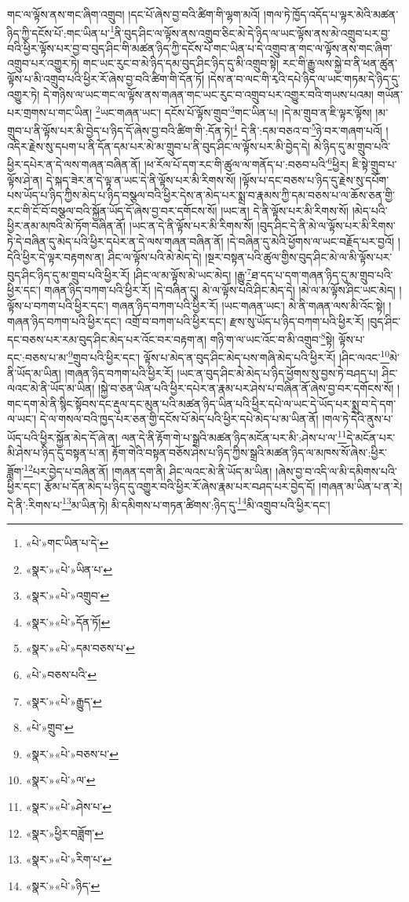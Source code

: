 གང་ལ་ལྟོས་ནས་གང་ཞིག་འགྲུབ། །དང་པོ་ཞེས་བྱ་བའི་ཚིག་གི་ལྷག་མའོ། །གལ་ཏེ་ཁྱོད་འདོད་པ་ལྟར་མེའི་མཚན་ཉིད་ཀྱི་དངོས་པོ་:གང་ཡིན་པ་\footnote{«པེ་»གང་ཡིན་པ་དེ་}ནི་བུད་ཤིང་ལ་ལྟོས་ནས་འགྲུབ་ཅིང་མེ་དེ་ཉིད་ལ་ཡང་ལྟོས་ནས་མེ་འགྲུབ་པར་བྱ་བའི་ཕྱིར་ལྟོས་པར་བྱ་བ་བུད་ཤིང་གི་མཚན་ཉིད་ཀྱི་དངོས་པོ་གང་ཡིན་པ་དེ་འགྲུབ་ན་གང་ལ་ལྟོས་ནས་གང་ཞིག་འགྲུབ་པར་འགྱུར་ཏེ། གང་ཡང་རུང་བ་མེ་ཉིད་དམ་བུད་ཤིང་ཉིད་དུ་མི་འགྲུབ་སྟེ། རང་གི་རྒྱུ་ལས་སྐྱེ་བ་ནི་ཕན་ཚུན་ལྟོས་པ་མི་འགྲུབ་པའི་ཕྱིར་རོ་ཞེས་བྱ་བའི་ཚིག་གི་དོན་ཏོ། །དེས་ན་བ་ལང་གི་རྭའི་དཔེ་ཉིད་ལ་ཡང་གཏམ་དེ་ཉིད་དུ་འགྱུར་ཏེ། དེ་གཉིས་ལ་ཡང་གང་ལ་ལྟོས་ནས་གཞན་གང་ཡང་རུང་བ་འགྲུབ་པར་འགྱུར་བའི་གཡས་པའམ། གཡོན་པར་གྲགས་པ་གང་ཡིན། \footnote{«སྣར་»«པེ་»ཡིན་པ་}ཡང་གཞན་ཡང་། དངོས་པོ་ལྟོས་གྲུབ་\footnote{«སྣར་»«པེ་»འགྲུབ་}གང་ཡིན་པ། །དེ་མ་གྲུབ་ན་ཇི་ལྟར་ལྟོས། །མ་གྲུབ་པ་ནི་ལྟོས་པར་མི་བྱེད་པ་ཉིད་དོ་ཞེས་བྱ་བའི་ཚིག་གི་:དོན་ཏེ།\footnote{«སྣར་»«པེ་»དོན་ཏོ།} དེ་ནི་:དམ་བཅའ་བ་\footnote{«སྣར་»«པེ་»དམ་བཅས་པ་}ཉེ་བར་གཞག་པའོ། །འདིར་རྗེས་སུ་དཔག་པ་ནི་དོན་དམ་པར་མེ་མ་གྲུབ་པ་ནི་བུད་ཤིང་ལ་ལྟོས་པར་མི་བྱེད་དེ། མེ་ཉིད་དུ་མ་གྲུབ་པའི་ཕྱིར་དཔེར་ན་དེ་ལས་གཞན་བཞིན་ནོ། །ཕ་རོལ་པོ་དག་རང་གི་ཚུལ་ལ་གནོད་པ་:བཅབ་པའི་\footnote{«པེ་»བཅས་པའི་}ཕྱིར། ཇི་སྟེ་གྲུབ་པ་ལྟོས་ཤེ་ན། དེ་སྐད་ཟེར་ན་དེ་ལྟ་ན་ཡང་དེ་ནི་ལྟོས་པར་མི་རིགས་སོ། །ལྟོས་པ་དང་བཅས་པ་ཉིད་དུ་རྗེས་སུ་དཔོག་པས་ཡོད་པ་ཉིད་ཀྱིས་མེད་པ་ཉིད་བསྩལ་བའི་ཕྱིར་དེས་ན་མེད་པར་སྨྲ་བ་རྣམས་ཀྱི་དམ་བཅས་པ་ལ་ཆོས་ཅན་གྱི་རང་གི་ངོ་བོ་བསྩལ་བའི་སྐྱོན་ཡོད་དོ་ཞེས་བྱ་བར་དགོངས་སོ། །ཡང་ན། དེ་ནི་ལྟོས་པར་མི་རིགས་སོ། །མེད་པའི་ཕྱིར་ནམ་མཁའི་མེ་ཏོག་བཞིན་ནོ། །ཡང་ན་དེ་ནི་ལྟོས་པར་མི་རིགས་སོ། །བུད་ཤིང་དེ་ནི་མེ་ལ་ལྟོས་པར་མི་རིགས་ཏེ་དེ་བཞིན་དུ་མེད་པའི་ཕྱིར་དཔེར་ན་དེ་ལས་གཞན་བཞིན་ནོ། །དེ་བཞིན་དུ་མེའི་ཕྱོགས་ལ་ཡང་བརྗོད་པར་བྱའོ། །དེའི་ཕྱིར་དེ་ལྟར་བརྟགས་ན། ཤིང་ལ་ལྟོས་པའི་མེ་མེད་དེ། །སྔར་བསྟན་པའི་ཚུལ་གྱིས་བུད་ཤིང་མེ་ལ་མི་ལྟོས་པར་བུད་ཤིང་ཉིད་དུ་མ་གྲུབ་པའི་ཕྱིར་རོ། །ཤིང་ལ་མ་ལྟོས་མེ་ཡང་མེད། །རྒྱུ་\footnote{«སྣར་»«པེ་»རྒྱུད་}ཐ་དད་པ་དག་གཞན་ཉིད་དུ་མ་གྲུབ་པའི་ཕྱིར་དང་། གཞན་ཉིད་བཀག་པའི་ཕྱིར་རོ། །དེ་བཞིན་དུ། མེ་ལ་ལྟོས་པའི་ཤིང་མེད་དེ། །མེ་ལ་མ་ལྟོས་ཤིང་ཡང་མེད། །ལྟོས་པ་བཀག་པའི་ཕྱིར་དང་། གཞན་ཉིད་བཀག་པའི་ཕྱིར་རོ། །ཡང་གཞན་ཡང་། མེ་ནི་གཞན་ལས་མི་འོང་སྟེ། །གཞན་ཉིད་བཀག་པའི་ཕྱིར་དང་། འགྲོ་བ་བཀག་པའི་ཕྱིར་དང་། རྫས་སུ་ཡོད་པ་ཉིད་བཀག་པའི་ཕྱིར་རོ། །བུད་ཤིང་དང་བཅས་པར་རམ་བུད་ཤིང་མེད་པར་འོང་བར་བརྟག་ན། གཉི་ག་ལ་ཡང་འོང་བ་མི་འགྲུབ་\footnote{«པེ་»གྲུབ་}སྟེ། ལྟོས་པ་དང་:བཅས་པ་མ་\footnote{«སྣར་»«པེ་»བཅས་པ་}གྲུབ་པའི་ཕྱིར་དང་། ལྟོས་པ་མེད་ན་བུད་ཤིང་མེད་པས་གཞི་མེད་པའི་ཕྱིར་རོ། །ཤིང་ལའང་\footnote{«སྣར་»«པེ་»ལ་}མེ་ནི་ཡོད་མ་ཡིན། །གཞན་ཉིད་བཀག་པའི་ཕྱིར་རོ། །ཡང་ན་བུད་ཤིང་མེ་མེད་པ་ཉིད་ཕྱོགས་སུ་བྱས་ཏེ་བཤད་པ། ཤིང་ལའང་མེ་ནི་ཡོད་མ་ཡིན། །སྐྱེ་བ་ཅན་ཡིན་པའི་ཕྱིར་དཔེར་ན་རྣམ་པར་ཤེས་པ་བཞིན་ནོ་ཞེས་བྱ་བར་དགོངས་སོ། །གང་དག་མེ་ནི་སྙིང་སྟོབས་དང་རྡུལ་དང་མུན་པའི་མཚན་ཉིད་ཡིན་པའི་ཕྱིར་དཔེ་ལ་ཡང་དེ་ཡོད་པར་སྨྲ་བ་དེ་དག་ལ་ཡང་། དེ་ལ་གསལ་བའི་ཁྱད་པར་ཅན་གྱི་དངོས་པོ་མེད་པའི་ཕྱིར་དཔེ་མེད་པ་མ་ཡིན་ནོ། །གལ་ཏེ་དེའི་ནུས་པ་ཡོད་པའི་ཕྱིར་སྐྱོན་མེད་དོ་ཞེ་ན། ལན་དེ་ནི་རྟོག་གེ་པ་སྒྲའི་མཚན་ཉིད་མངོན་པར་མི་:ཤེས་པ་ལ་\footnote{«སྣར་»«པེ་»ཤེས་པ་}དེ་མངོན་པར་མི་ཤེས་པ་ཉིད་དུ་བསྟན་པ་ན། རྟོག་གེའི་བསྟན་བཅོས་ཤེས་པ་ཉིད་ཀྱིས་སྒྲའི་མཚན་ཉིད་ལ་མཁས་སོ་ཞེས་:ཕྱིར་ཟློག་\footnote{«སྣར་»ཕྱིར་བཟློག་}པར་བྱེད་པ་བཞིན་ནོ། །གཞན་དག་ནི། ཤིང་ལའང་མེ་ནི་ཡོད་མ་ཡིན། །ཞེས་བྱ་བ་འདི་ལ་མི་དམིགས་པའི་ཕྱིར་དང་། རྩོམ་པ་དོན་མེད་པ་ཉིད་དུ་འགྱུར་བའི་ཕྱིར་རོ་ཞེས་རྣམ་པར་བཤད་པར་བྱེད་དོ། །གཞན་མ་ཡིན་པ་ན་རེ། དེ་ནི་:རིགས་པ་\footnote{«སྣར་»«པེ་»རིག་པ་}མ་ཡིན་ཏེ། མི་དམིགས་པ་གཏན་ཚིགས་:ཉིད་དུ་\footnote{«སྣར་»«པེ་»ཉིད་}མི་འགྲུབ་པའི་ཕྱིར་དང་། 